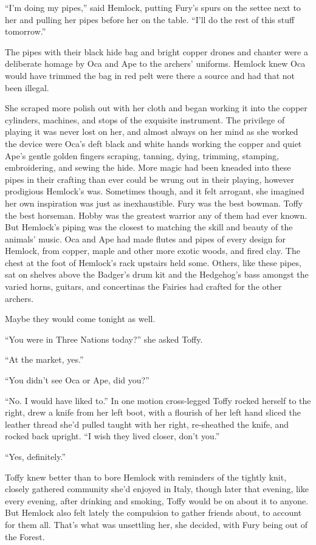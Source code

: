 \documentclass[11pt,a5paper]{article}
\begin{document}
``I'm doing my pipes,'' said Hemlock, putting Fury's spurs on the settee next to her and pulling her pipes before her on the table. ``I'll do the rest of this stuff tomorrow.''

The pipes with their black hide bag and bright copper drones and chanter were a deliberate homage by Oca and Ape to the archers' uniforms. Hemlock knew Oca would have trimmed the bag in red pelt were there a source and had that not been illegal.

She scraped more polish out with her cloth and began working it into the copper cylinders, machines, and stops of the exquisite instrument. The privilege of playing it was never lost on her, and almost always on her mind as she worked the device were Oca's deft black and white hands working the copper and quiet Ape's gentle golden fingers scraping, tanning, dying, trimming, stamping, embroidering, and sewing the hide. More magic had been kneaded into these pipes in their crafting than ever could be wrung out in their playing, however prodigious Hemlock's was. Sometimes though, and it felt arrogant, she imagined her own inspiration was just as inexhaustible. Fury was the best bowman. Toffy the best horseman. Hobby was the greatest warrior any of them had ever known. But Hemlock's piping was the closest to matching the skill and beauty of the animals' music. Oca and Ape had made flutes and pipes of every design for Hemlock, from copper, maple and other more exotic woods, and fired clay. The chest at the foot of Hemlock's rack upstairs held some. Others, like these pipes, sat on shelves above the Badger's drum kit and the Hedgehog's bass amongst the varied horns, guitars, and concertinas the Fairies had crafted for the other archers.

Maybe they would come tonight as well.

``You were in Three Nations today?'' she asked Toffy.

``At the market, yes.''

``You didn't see Oca or Ape, did you?''

``No. I would have liked to.'' In one motion cross-legged Toffy rocked herself to the right, drew a knife from her left boot, with a flourish of her left hand sliced the leather thread she'd pulled taught with her right, re-sheathed the knife, and rocked back upright. ``I wish they lived closer, don't you.''

``Yes, definitely.''

Toffy knew better than to bore Hemlock with reminders of the tightly knit, closely gathered community she'd enjoyed in Italy, though later that evening, like every evening, after drinking and smoking, Toffy would be on about it to anyone. But Hemlock also felt lately the compulsion to gather friends about, to account for them all. That's what was unsettling her, she decided, with Fury being out of the Forest.
\end{document}
